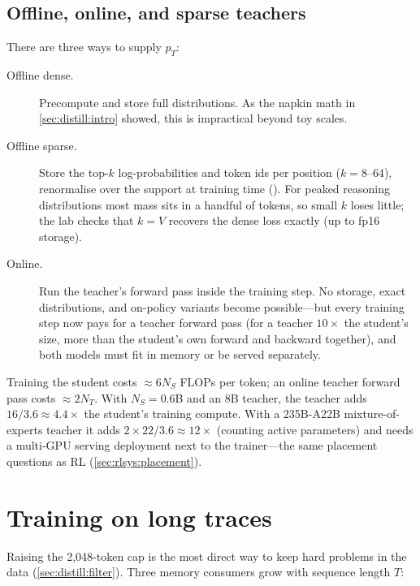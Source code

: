 \subsection{Offline, online, and sparse teachers}

There are three ways to supply $p_T$:
\begin{description}
\item[Offline dense.] Precompute and store full distributions. As the napkin math in
\cref{sec:distill:intro} showed, this is impractical beyond toy scales.
\item[Offline sparse.] Store the top-$k$ log-probabilities and token ids per position
($k=8$--$64$), renormalise over the support at training time (). For
peaked reasoning distributions most mass sits in a handful of tokens, so small $k$ loses little;
the lab checks that $k=V$ recovers the dense loss exactly (up to fp16 storage).
\item[Online.] Run the teacher's forward pass inside the training step. No storage, exact
distributions, and on-policy variants become possible---but every training step now pays for a
teacher forward pass (for a teacher $10\times$ the student's size, more than the student's own
forward and backward together), and both models must fit in memory or be served separately.
\end{description}

\begin{napkinmath}
Training the student costs $\approx 6N_S$ FLOPs per token; an online teacher forward pass costs
$\approx 2N_T$. With $N_S=0.6$B and an 8B teacher, the teacher adds $16/3.6\approx 4.4\times$ the
student's training compute. With a 235B-A22B mixture-of-experts teacher it adds
$2\times 22/3.6\approx 12\times$ (counting active parameters) and needs a multi-GPU serving
deployment next to the trainer---the same placement questions as RL (\cref{sec:rlsys:placement}).
\end{napkinmath}

\section{Training on long traces}\label{sec:distill:longseq}

Raising the 2{,}048-token cap is the most direct way to keep hard problems in the data
(\cref{sec:distill:filter}). Three memory consumers grow with sequence length $T$:

